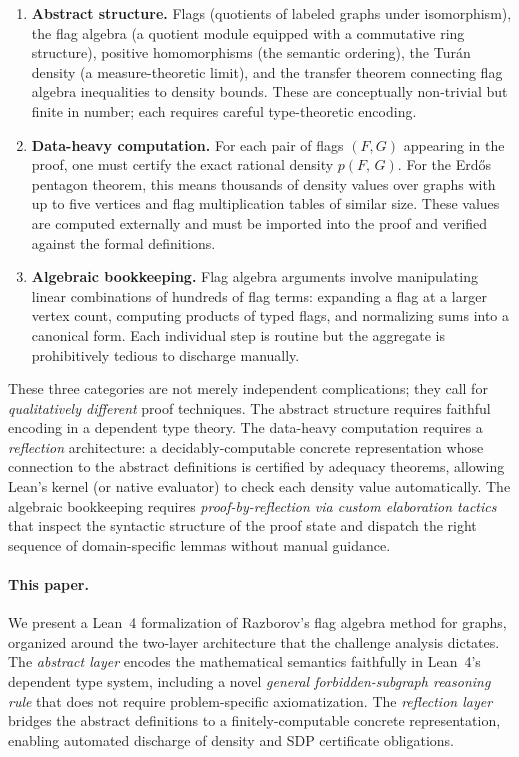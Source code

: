 \documentclass{article}
\newcommand{\den}[2]{p(#1,\,#2)}
\begin{document}
\begin{enumerate}
  \item \textbf{Abstract structure.}  Flags (quotients of labeled graphs under
    isomorphism), the flag algebra (a quotient module equipped with a commutative
    ring structure), positive homomorphisms (the semantic ordering),
    the Turán density (a measure-theoretic limit), and the transfer theorem
    connecting flag algebra inequalities to density bounds.  These are
    conceptually non-trivial but finite in number; each requires careful
    type-theoretic encoding.

  \item \textbf{Data-heavy computation.}  For each pair of flags $(F,G)$
    appearing in the proof, one must certify the exact rational density
    $\den{F}{G}$.  For the Erd\H{o}s pentagon theorem,
    this means thousands of density values over graphs with up to five vertices
    and flag multiplication tables of similar size.  These values are computed
    externally and must be imported into the proof and verified against the
    formal definitions.

  \item \textbf{Algebraic bookkeeping.}  Flag algebra arguments involve
    manipulating linear combinations of hundreds of flag terms: expanding a
    flag at a larger vertex count, computing products of typed flags, and
    normalizing sums into a canonical form.  Each individual step is routine
    but the aggregate is prohibitively tedious to discharge manually.
\end{enumerate}

These three categories are not merely independent complications; they call for
\emph{qualitatively different} proof techniques.  The abstract structure
requires faithful encoding in a dependent type theory.
The data-heavy computation requires a \emph{reflection} architecture:
a decidably-computable concrete representation whose connection to the abstract
definitions is certified by adequacy theorems, allowing Lean's kernel (or native
evaluator) to check each density value automatically.
The algebraic bookkeeping requires \emph{proof-by-reflection via custom
elaboration tactics} that inspect the syntactic structure of the proof state
and dispatch the right sequence of domain-specific lemmas without manual
guidance.

\paragraph{This paper.}
We present a Lean~4 formalization of Razborov's flag algebra method for
graphs, organized around the two-layer architecture that the challenge analysis
dictates.  The \emph{abstract layer} encodes the mathematical semantics
faithfully in Lean~4's dependent type system, including a novel
\emph{general forbidden-subgraph reasoning rule} that does not require
problem-specific axiomatization.  The \emph{reflection layer} bridges the
abstract definitions to a finitely-computable concrete representation, enabling
automated discharge of density and SDP certificate obligations.
\end{document}
